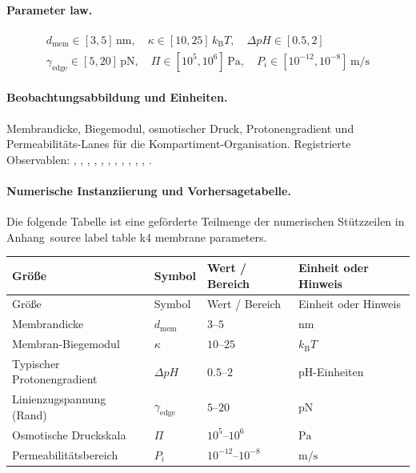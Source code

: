 \paragraph{Parameter law.}
\[
\begin{gathered} d_{\mathrm{mem}} \in [3, 5]\,\mathrm{nm},\quad \kappa \in [10, 25]\,k_{\mathrm{B}}T,\quad \Delta pH \in [0.5, 2] \\ \gamma_{\mathrm{edge}} \in [5,20]\,\mathrm{pN},\quad \Pi \in [10^5,10^6]\,\mathrm{Pa},\quad P_i \in [10^{-12},10^{-8}]\,\mathrm{m/s} \end{gathered}
\]

\paragraph{Beobachtungsabbildung und Einheiten.}
Membrandicke, Biegemodul, osmotischer Druck, Protonengradient und Permeabilitäts-Lanes für die Kompartiment-Organisation.
Registrierte Observablen: , \allowbreak {}, \allowbreak {}, \allowbreak {}, \allowbreak {}, \allowbreak {}, \allowbreak {}, \allowbreak {}, \allowbreak {}, \allowbreak {}, \allowbreak {}, \allowbreak {}.

\paragraph{Numerische Instanziierung und Vorhersagetabelle.}
Die folgende Tabelle ist eine geförderte Teilmenge der numerischen Stützzeilen in Anhang~source label table k4 membrane parameters.
\begin{longtable}{@{}L{0.27\textwidth}L{0.15\textwidth}L{0.24\textwidth}L{0.16\textwidth}@{}}
\toprule
Größe & Symbol & Wert / Bereich & Einheit oder Hinweis \\
\midrule
\endfirsthead
\toprule
Größe & Symbol & Wert / Bereich & Einheit oder Hinweis \\
\midrule
\endhead
Membrandicke & $\scriptstyle d_{\mathrm{mem}}$ & $3\text{--}5$ & $\mathrm{nm}$ \\
Membran-Biegemodul & $\scriptstyle \kappa$ & $10\text{--}25$ & $k_{\mathrm{B}}T$ \\
Typischer Protonengradient & $\scriptstyle \Delta pH$ & $0.5\text{--}2$ & pH-Einheiten \\
Linienzugspannung (Rand) & $\scriptstyle \gamma_{\mathrm{edge}}$ & $5\text{--}20$ & $\mathrm{pN}$ \\
Osmotische Druckskala & $\scriptstyle \Pi$ & $10^5\text{--}10^6$ & $\mathrm{Pa}$ \\
Permeabilitätsbereich & $\scriptstyle P_i$ & $10^{-12}\text{--}10^{-8}$ & $\mathrm{m/s}$ \\
\bottomrule
\end{longtable}

